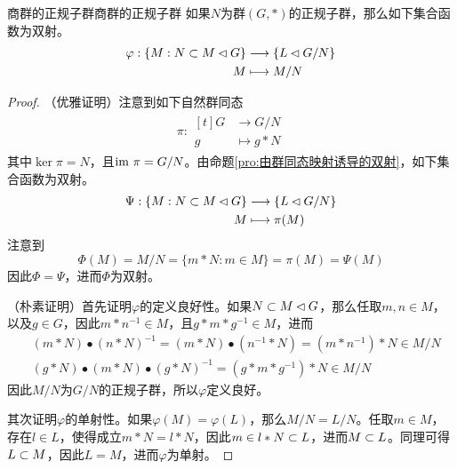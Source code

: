 \begin{proposition}{商群的正规子群}{商群的正规子群}
	如果$N$为群$(G,*)$的正规子群，那么如下集合函数为双射。
	\begin{align*}
		\varphi:\begin{aligned}[t]
			\{ M:N\subset M \lhd G \}&\longrightarrow \{ L\lhd G/N \}\\
			M&\longmapsto M/N
		\end{aligned}
	\end{align*}
\end{proposition}

\begin{proof}
	（优雅证明）注意到如下自然群同态
	\begin{align*}
		\pi:\begin{aligned}[t]
			G&\longrightarrow G/N\\
			g&\longmapsto g*N
		\end{aligned}
	\end{align*}
	其中$\ker\pi=N$，且$\text{im } \pi=G/N$。由命题\ref{pro:由群同态映射诱导的双射}，如下集合函数为双射。
	\begin{align*}
		\Psi:\begin{aligned}[t]
			\{ M:N\subset M \lhd G \}&\longrightarrow \{ L\lhd G/N \}\\
			M&\longmapsto \pi(M)
		\end{aligned}
	\end{align*}
	注意到
	$$
	\Phi(M)=M/N=\{ m*N:m\in M \}=\pi(M)=\Psi(M)
	$$
	因此$\Phi=\Psi$，进而$\Phi$为双射。
	
	（朴素证明）首先证明$\varphi$的定义良好性。如果$N\subset M \lhd G$，那么任取$m,n\in M$，以及$g\in G$，因此$m*n^{-1}\in M$，且$g*m*g^{-1}\in M$，进而
	\begin{align*}
		&(m*N)\bullet(n*N)^{-1}=(m*N)\bullet(n^{-1}*N)=(m*n^{-1})*N\in M/N\\
		&(g*N)\bullet(m*N)\bullet(g*N)^{-1}=(g*m*g^{-1})*N\in M/N
	\end{align*}
	因此$M/N$为$G/N$的正规子群，所以$\varphi$定义良好。
	
	其次证明$\varphi$的单射性。如果$\varphi(M)=\varphi(L)$，那么$M/N=L/N$。任取$m\in M$，存在$l\in L$，使得成立$m*N=l*N$，因此$m\in l*N\subset L$，进而$M\subset L$。同理可得$L\subset M$，因此$L=M$，进而$\varphi$为单射。
	

\end{proof}
